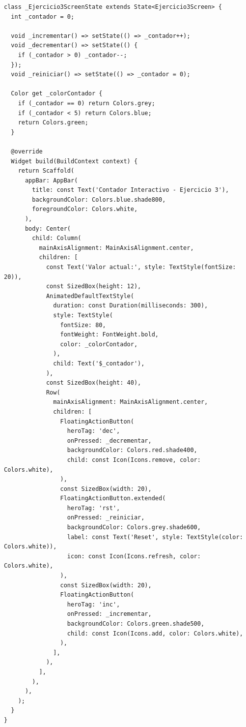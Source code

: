 \documentclass[12pt,a4paper]{article}
\begin{document}
\begin{lstlisting}[caption={Lógica y estado del Contador (lib/screens/ejercicio3\_screen.dart)}]
class _Ejercicio3ScreenState extends State<Ejercicio3Screen> {
  int _contador = 0;

  void _incrementar() => setState(() => _contador++);
  void _decrementar() => setState(() {
    if (_contador > 0) _contador--;
  });
  void _reiniciar() => setState(() => _contador = 0);

  Color get _colorContador {
    if (_contador == 0) return Colors.grey;
    if (_contador < 5) return Colors.blue;
    return Colors.green;
  }

  @override
  Widget build(BuildContext context) {
    return Scaffold(
      appBar: AppBar(
        title: const Text('Contador Interactivo - Ejercicio 3'),
        backgroundColor: Colors.blue.shade800,
        foregroundColor: Colors.white,
      ),
      body: Center(
        child: Column(
          mainAxisAlignment: MainAxisAlignment.center,
          children: [
            const Text('Valor actual:', style: TextStyle(fontSize: 20)),
            const SizedBox(height: 12),
            AnimatedDefaultTextStyle(
              duration: const Duration(milliseconds: 300),
              style: TextStyle(
                fontSize: 80,
                fontWeight: FontWeight.bold,
                color: _colorContador,
              ),
              child: Text('$_contador'),
            ),
            const SizedBox(height: 40),
            Row(
              mainAxisAlignment: MainAxisAlignment.center,
              children: [
                FloatingActionButton(
                  heroTag: 'dec',
                  onPressed: _decrementar,
                  backgroundColor: Colors.red.shade400,
                  child: const Icon(Icons.remove, color: Colors.white),
                ),
                const SizedBox(width: 20),
                FloatingActionButton.extended(
                  heroTag: 'rst',
                  onPressed: _reiniciar,
                  backgroundColor: Colors.grey.shade600,
                  label: const Text('Reset', style: TextStyle(color: Colors.white)),
                  icon: const Icon(Icons.refresh, color: Colors.white),
                ),
                const SizedBox(width: 20),
                FloatingActionButton(
                  heroTag: 'inc',
                  onPressed: _incrementar,
                  backgroundColor: Colors.green.shade500,
                  child: const Icon(Icons.add, color: Colors.white),
                ),
              ],
            ),
          ],
        ),
      ),
    );
  }
}
\end{lstlisting}
\end{document}
